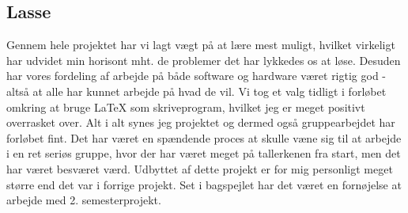 \subsection{Lasse}
Gennem hele projektet har vi lagt vægt på at lære mest muligt, hvilket virkeligt har udvidet min horisont mht. de problemer det har lykkedes os at løse. Desuden har vores fordeling af arbejde på både software og hardware været rigtig god - altså at alle har kunnet arbejde på hvad de vil. Vi tog et valg tidligt i forløbet omkring at bruge LaTeX som skriveprogram, hvilket jeg er meget positivt overrasket over. Alt i alt synes jeg projektet og dermed også gruppearbejdet har forløbet fint. Det har været en spændende proces at skulle væne sig til at arbejde i en ret seriøs gruppe, hvor der har været meget på tallerkenen fra start, men det har været besværet værd. Udbyttet af dette projekt er for mig personligt meget større end det var i forrige projekt. Set i bagspejlet har det været en fornøjelse at arbejde med 2. semesterprojekt. 
